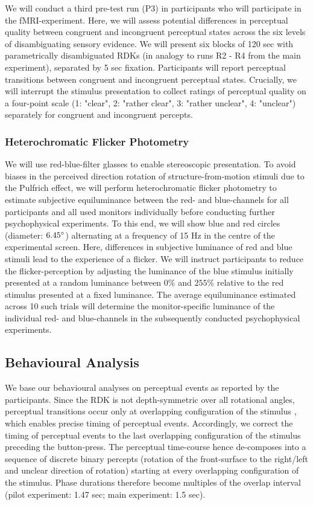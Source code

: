 \documentclass[12pt]{article}
\begin{document}
We will conduct a third pre-test run (P3) in participants who will participate in the fMRI-experiment. Here, we will assess potential differences in perceptual quality between congruent and incongruent perceptual states across the six levels of disambiguating sensory evidence. We will present six blocks of 120 sec with parametrically disambiguated RDKs (in analogy to runs R2 - R4 from the main experiment), separated by 5 sec fixation. Participants will report perceptual transitions between congruent and incongruent perceptual states. Crucially, we will interrupt the stimulus presentation to collect ratings of perceptual quality on a four-point scale (1: "clear", 2: "rather clear", 3: "rather unclear", 4: "unclear") separately for congruent and incongruent percepts.

\subsubsection{Heterochromatic Flicker Photometry}
We will use red-blue-filter glasses to enable stereoscopic presentation. To avoid biases in the perceived direction rotation of structure-from-motion stimuli due to the Pulfrich effect, we will perform heterochromatic flicker photometry to estimate subjective equiluminance between the red- and blue-channels for all participants and all used monitors individually before conducting further psychophysical experiments. To this end, we will show blue and red circles (diameter: $6.45\degree$) alternating at a frequency of 15 Hz in the centre of the experimental screen. Here, differences in subjective luminance of red and blue stimuli lead to the experience of a flicker. We will instruct participants to reduce the flicker-perception by adjusting the luminance of the blue stimulus initially presented at a random luminance between $0\%$ and $255\%$ relative to the red stimulus presented at a fixed luminance. The average equiluminance estimated across 10 such trials will determine the monitor-specific luminance of the individual red- and blue-channels in the subsequently conducted psychophysical experiments. 

\subsection{Behavioural Analysis}
We base our behavioural analyses on perceptual events as reported by the participants. Since the RDK is not depth-symmetric over all rotational angles, perceptual transitions occur only at overlapping configuration of the stimulus \parencite{Pastukhov2012a, Weilnhammer2013}, which enables precise timing of perceptual events. Accordingly, we correct the timing of perceptual events to the last overlapping configuration of the stimulus preceding the button-press. The perceptual time-course hence de-composes into a sequence of discrete binary percepts (rotation of the front-surface to the right/left and unclear direction of rotation) starting at every overlapping configuration of the stimulus. Phase durations therefore become multiples of the overlap interval (pilot experiment: 1.47 sec; main experiment: 1.5 sec). 
\end{document}
